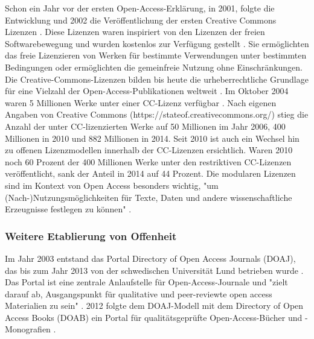 Schon ein Jahr vor der ersten Open-Access-Erklärung, in 2001, folgte die Entwicklung und 2002 die Veröffentlichung der ersten Creative Commons Lizenzen \cite{garcia_2010_open}. Diese Lizenzen waren inspiriert von den Lizenzen der freien Softwarebewegung und wurden kostenlos zur Verfügung gestellt \cite{Minjeong_2007}. Sie ermöglichten das freie Lizenzieren von Werken für bestimmte Verwendungen unter bestimmten Bedingungen oder ermöglichten die gemeinfreie Nutzung ohne Einschränkungen. Die Creative-Commons-Lizenzen bilden bis heute die urheberrechtliche Grundlage für eine Vielzahl der Open-Access-Publikationen weltweit \cite{suchen}. Im Oktober 2004 waren 5 Millionen Werke unter einer CC-Lizenz verfügbar \cite{Suchen_Forbes_Movement_Seeks_Copyright_Alternatives}. Nach eigenen Angaben von Creative Commons (https://stateof.creativecommons.org/) stieg die Anzahl der unter CC-lizenzierten Werke auf 50 Millionen im Jahr 2006, 400 Millionen in 2010 und 882 Millionen in 2014. Seit 2010 ist auch ein Wechsel hin zu offenen Lizenzmodellen innerhalb der CC-Lizenzen ersichtlich. Waren 2010 noch 60 Prozent der 400 Millionen Werke unter den restriktiven CC-Lizenzen veröffentlicht, sank der Anteil in 2014 auf 44 Prozent. Die modularen Lizenzen sind im Kontext von Open Access besonders wichtig, "um (Nach-)Nutzungsmöglichkeiten für Texte, Daten und andere wissenschaftliche Erzeugnisse festlegen zu können" \cite{suchen-Hoffmann-Zugang-undVerwertung-oeffentlicher-Informationen}.

\subsubsection{Weitere Etablierung von Offenheit}

Im Jahr 2003 entstand das Portal Directory of Open Access Journals (DOAJ), das bis zum Jahr 2013 von der schwedischen Universität Lund betrieben wurde \cite{doaj_2015_about}. Das Portal ist eine zentrale Anlaufstelle für Open-Access-Journale \cite{suber_2015} und "zielt darauf ab, Ausgangspunkt für qualitative und peer-reviewte open access Materialien zu sein" \cite{doaj_2015_about}. 2012 folgte dem DOAJ-Modell mit dem Directory of Open Access Books (DOAB) ein Portal für qualitätsgeprüfte Open-Access-Bücher und -Monografien \cite{adema_2013_political}.

